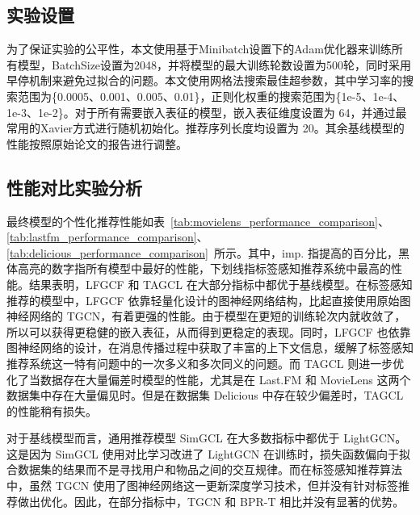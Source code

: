 \subsection{实验设置}
为了保证实验的公平性，本文使用基于Minibatch设置下的Adam优化器\cite{kingma_adam_2014}来训练所有模型，BatchSize设置为2048，并将模型的最大训练轮数设置为500轮，同时采用早停机制\cite{prechelt_early_2012}来避免过拟合的问题。本文使用网格法搜索最佳超参数，其中学习率的搜索范围为\{0.0005、0.001、0.005、0.01\}，正则化权重的搜索范围为\{1e-5、1e-4、1e-3、1e-2\}。对于所有需要嵌入表征的模型，嵌入表征维度设置为 64，并通过最常用的Xavier方式\cite{glorot_understanding_nodate}进行随机初始化。推荐序列长度均设置为 20。其余基线模型的性能按照原始论文的报告进行调整。

\subsection{性能对比实验分析}
最终模型的个性化推荐性能如表~\ref{tab:movielens_performance_comparison}、\ref{tab:lastfm_performance_comparison}、\ref{tab:delicious_performance_comparison}~所示。其中，imp. 指提高的百分比，黑体高亮的数字指所有模型中最好的性能，下划线指标签感知推荐系统中最高的性能。结果表明，LFGCF 和 TAGCL 在大部分指标中都优于基线模型。在标签感知推荐的模型中，LFGCF 依靠轻量化设计的图神经网络结构，比起直接使用原始图神经网络的 TGCN，有着更强的性能。由于模型在更短的训练轮次内就收敛了，所以可以获得更稳健的嵌入表征，从而得到更稳定的表现。同时，LFGCF 也依靠图神经网络的设计，在消息传播过程中获取了丰富的上下文信息，缓解了标签感知推荐系统这一特有问题中的一次多义和多次同义的问题。而 TAGCL 则进一步优化了当数据存在大量偏差时模型的性能，尤其是在 Last.FM 和 MovieLens 这两个数据集中存在大量偏见时。但是在数据集 Delicious 中存在较少偏差时，TAGCL 的性能稍有损失。

对于基线模型而言，通用推荐模型 SimGCL 在大多数指标中都优于 LightGCN。这是因为 SimGCL 使用对比学习改进了 LightGCN 在训练时，损失函数偏向于拟合数据集的结果而不是寻找用户和物品之间的交互规律。而在标签感知推荐算法中，虽然 TGCN 使用了图神经网络这一更新深度学习技术，但并没有针对标签推荐做出优化。因此，在部分指标中，TGCN 和 BPR-T 相比并没有显著的优势。
